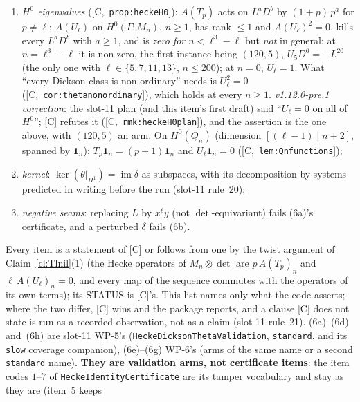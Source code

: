 \documentclass[11pt]{article}
\theoremstyle{remark}
\newcommand{\F}{\mathbb{F}}
\newcommand{\Ga}{\Gamma}
\newcommand{\Fl}{\F_\ell}
\DeclareMathOperator{\im}{im}
\newcommand{\Mn}{M_n}
\newcommand{\HA}[1]{[C,~\texttt{#1}]}      %
\begin{document}
\begin{enumerate}
\begin{enumerate}[label=(6\alph*)]
    untwisted, and $\delta$ intertwines $A(T_p)_{Q_n}$ with $p\,A(T_p)_n$; and over $\Fl$
    $A(U_\ell)_{n+\ell+1}\,\theta=0$, already on cochains (Claim~\ref{cl:Tlnil}(1),
    \HA{prop:thetatwist}), and $\delta\,A(U_\ell)_{Q_n}=0$;
  \item \emph{$H^0$ eigenvalues} (\HA{prop:heckeH0}): $A(T_p)$ acts on $L^aD^b$ by
    $(1+p)\,p^a$ for $p\ne\ell$; $A(U_\ell)$ on $H^0(\Ga;\Mn)$, $n\ge1$, has rank $\le1$ and
    $A(U_\ell)^2=0$, kills every $L^aD^b$ with $a\ge1$, and is \emph{zero for $n<\ell^3-\ell$} but
    \emph{not} in general: at $n=\ell^3-\ell$ it is non-zero, the first instance being $(120,5)$,
    $U_5D^6=-L^{20}$ (the only one with $\ell\in\{5,7,11,13\}$, $n\le200$); at $n=0$,
    $U_\ell=1$. What ``every Dickson class is non-ordinary'' needs is $U_\ell^2=0$
    (\HA{cor:thetanonordinary}), which holds at every $n\ge1$. \emph{v1.12.0-pre.1 correction}:
    the slot-11 plan (and this item's first draft) said ``$U_\ell=0$ on all of $H^0$''; [C]
    refutes it (\HA{rmk:heckeH0plan}), and the assertion is the one above, with $(120,5)$ an arm.
    On $H^0(Q_n)$ (dimension $[(\ell-1)\mid n+2]$, spanned by $\mathbf 1_n$):
    $T_p\mathbf 1_n=(p+1)\mathbf 1_n$ and $U_\ell\mathbf 1_n=0$ (\HA{lem:Qnfunctions});
  \item \emph{kernel}: $\ker(\theta|_{H^1})=\im\delta$ as subspaces, with its decomposition by
    systems predicted in writing before the run (slot-11 rule~20);
  \item \emph{negative seams}: replacing $L$ by $x^\ell y$ (not $\det$-equivariant) fails (6a)'s
    certificate, and a perturbed $\delta$ fails (6b).
  \end{enumerate}
  Every item is a statement of [C] or follows from one by the twist argument of
  Claim~\ref{cl:Tlnil}(1) (the Hecke operators of $\Mn\otimes\det$ are $p\,A(T_p)_n$ and
  $\ell\,A(U_\ell)_n=0$, and every map of the sequence commutes with the operators of its own
  terms); its STATUS is [C]'s. This list names only what the code asserts; where the two differ,
  [C] wins and the package reports, and a clause [C] does not state is run as a recorded
  observation, not as a claim (slot-11 rule~21). (6a)--(6d) and~(6h) are
  slot-11 WP-5's (\texttt{HeckeDicksonThetaValidation}, \texttt{standard}, and its \texttt{slow}
  coverage companion), (6e)--(6g) WP-6's (arms of the same name or a second \texttt{standard}
  name). \textbf{They are validation arms, not certificate items}: the item codes $1$--$7$ of
  \texttt{HeckeIdentityCertificate} are its tamper vocabulary and stay as they are (item~5 keeps

\end{enumerate}
\end{document}
